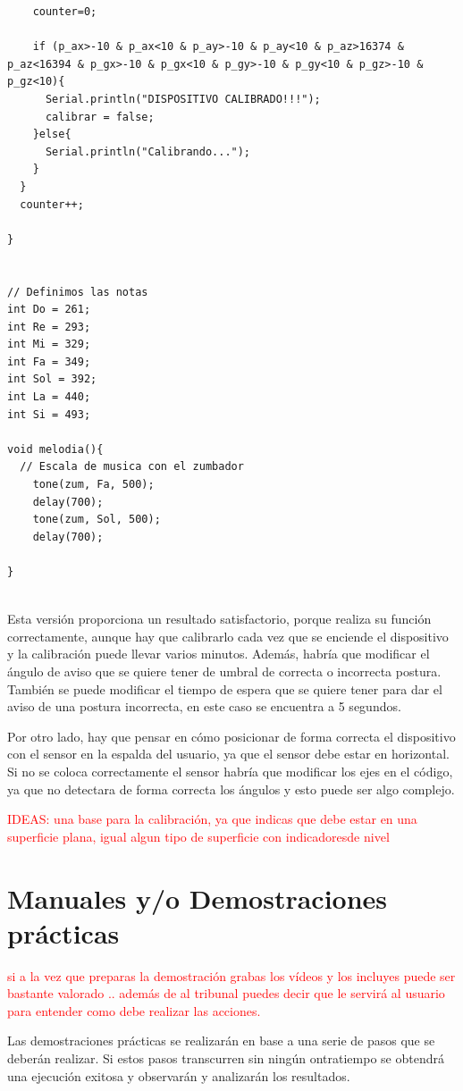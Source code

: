 \begin{lstlisting}
    counter=0; 

    if (p_ax>-10 & p_ax<10 & p_ay>-10 & p_ay<10 & p_az>16374 & p_az<16394 & p_gx>-10 & p_gx<10 & p_gy>-10 & p_gy<10 & p_gz>-10 & p_gz<10){
      Serial.println("DISPOSITIVO CALIBRADO!!!");
      calibrar = false;
    }else{
      Serial.println("Calibrando...");
    }
  } 
  counter++;

}


// Definimos las notas
int Do = 261;
int Re = 293;
int Mi = 329;
int Fa = 349;
int Sol = 392;
int La = 440;
int Si = 493;

void melodia(){
  // Escala de musica con el zumbador
    tone(zum, Fa, 500);
    delay(700);
    tone(zum, Sol, 500);
    delay(700);
    
}


\end{lstlisting}

Esta versión proporciona un resultado satisfactorio, porque realiza su función correctamente, aunque hay que calibrarlo cada vez que se enciende el dispositivo y la calibración puede llevar varios minutos. Además, habría que modificar el ángulo de aviso que se quiere tener de umbral de correcta o incorrecta postura. También se puede modificar el tiempo de espera que se quiere tener para dar el aviso de una postura incorrecta, en este caso se encuentra a 5 segundos.

Por otro lado, hay que pensar en cómo posicionar de forma correcta el dispositivo con el sensor en la espalda del usuario, ya que el sensor debe estar en horizontal. Si no se coloca correctamente el sensor habría que modificar los ejes en el código, ya que no detectara de forma correcta los ángulos y esto puede ser algo complejo.

\textcolor{red}{IDEAS: una base para la calibración, ya que indicas que debe estar en una superficie plana, igual algun tipo de superficie con indicadoresde nivel}

\newpage
\section{Manuales y/o Demostraciones prácticas}

\textcolor{red}{si a la vez que preparas la demostración grabas los vídeos y los incluyes puede ser bastante valorado .. además de al tribunal puedes decir que le servirá al usuario para entender como debe realizar las acciones.}

Las demostraciones prácticas se realizarán en base a una serie de pasos que se deberán realizar. Si estos pasos transcurren sin ningún ontratiempo se obtendrá una ejecución exitosa y observarán y analizarán los resultados.


